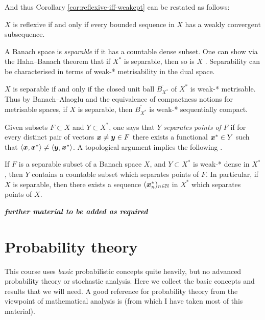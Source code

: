 And thus Corollary \ref{cor:reflexive-iff-weakcpt} can be restated as follows:

\begin{cor}\label{cor:reflexive-bdd-subsequence}
  $X$ is reflexive if and only if every bounded sequence in $X$ has a weakly convergent subsequence.
\end{cor}

A Banach space is \emph{separable} if it has a countable dense subset.
One can show via the Hahn--Banach theorem that if $X^*$ is separable, then so is $X$ \cite[Theorem III.7]{RS80}.
Separability can be characterised in terms of weak-* metrisability in the dual space.

\begin{thm}\label{thm:sep-met-dual}
  $X$ is separable if and only if the closed unit ball $\overline{B_{X^*}}$ of $X^*$ is weak-* metrisable.
  Thus by Banach--Alaoglu and the equivalence of compactness notions for metrisable spaces, if $X$ is separable, then $\overline{B_{X^*}}$ is weak-* sequentially compact.
\end{thm}

Given subsets $F \subset X$ and $Y \subset X^{*}$, one says that $Y$ \emph{separates points of $F$} if for every distinct pair of vectors $\bm{x} \neq \bm{y} \in F$ there exists a functional $\bm{x}^{*} \in Y$ such that $\langle \bm{x}, \bm{x}^{*} \rangle \neq \langle \bm{y}, \bm{x}^{*} \rangle$.
A topological argument implies the following \cite[Proposition B.1.11]{HNVW16}.

\begin{prop}\label{prop:sep-sep-points}
  If $F$ is a separable subset of a Banach space $X$, and $Y \subset X^{*}$ is weak-* dense in $X^{*}$, then $Y$ contains a countable subset which separates points of $F$.
  In particular, if $X$ is separable, then there exists a sequence $(\bm{x}_{n}^{*})_{n \in \mathbb{N}}$ in $X^{*}$ which separates points of $X$.
\end{prop}

\textbf{\emph{further material to be added as required}}

\section{Probability theory}\label{sec:probability}

This course uses \emph{basic} probabilistic concepts quite heavily, but no advanced probability theory or stochastic analysis.
Here we collect the basic concepts and results that we will need.
A good reference for probability theory from the viewpoint of mathematical analysis is \cite{rD04} (from which I have taken most of this material).

